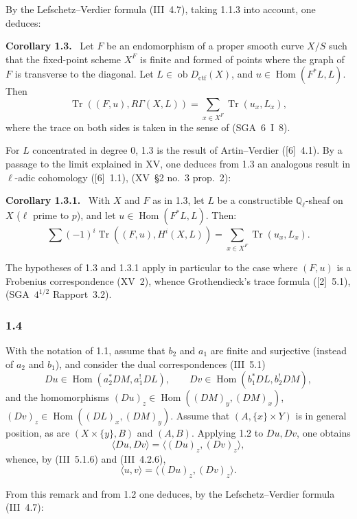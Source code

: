 \documentclass[11pt]{article}
\newenvironment{statement}[1]{\par\medskip\noindent\textbf{#1.}\ }{\par\medskip}
\DeclareMathOperator{\Hom}{Hom}
\newcommand{\ob}{\operatorname{ob}}
\providecommand{\ctf}{\mathrm{ctf}}
\providecommand{\Tr}{\operatorname{Tr}}
\providecommand{\Tr}{\operatorname{Tr}}
\providecommand{\Tr}{\operatorname{Tr}}
\providecommand{\Hom}{\operatorname{Hom}}
\providecommand{\ob}{\operatorname{ob}}
\providecommand{\Tr}{\operatorname{Tr}}
\providecommand{\Hom}{\operatorname{Hom}}
\providecommand{\Tr}{\operatorname{Tr}}
\begin{document}
By the Lefschetz--Verdier formula (III~4.7), taking 1.1.3 into account, one deduces:

\begin{statement}{Corollary 1.3}
Let $F$ be an endomorphism of a proper smooth curve $X/S$ such that the fixed-point scheme $X^F$ is finite and formed of points where the graph of $F$ is transverse to the diagonal. Let $L\in\ob D_{\ctf}(X)$, and $u\in\Hom(F^*L,L)$. Then
\[
\Tr((F,u),R\Gamma(X,L))=\sum_{x\in X^F}\Tr(u_x,L_x),
\]
where the trace on both sides is taken in the sense of (SGA~6~I~8).
\end{statement}

For $L$ concentrated in degree $0$, 1.3 is the result of Artin--Verdier ([6]~4.1). By a passage to the limit explained in XV, one deduces from 1.3 an analogous result in $\ell$-adic cohomology ([6]~1.1), (XV~\S2 no.~3 prop.~2):

\begin{statement}{Corollary 1.3.1}
With $X$ and $F$ as in 1.3, let $L$ be a constructible $\mathbb Q_\ell$-sheaf on $X$ ($\ell$ prime to $p$), and let $u\in\Hom(F^*L,L)$. Then:
\[
\sum(-1)^i\Tr((F,u),H^i(X,L))=\sum_{x\in X^F}\Tr(u_x,L_x).
\]
\end{statement}

The hypotheses of 1.3 and 1.3.1 apply in particular to the case where $(F,u)$ is a Frobenius correspondence (XV~2), whence Grothendieck's trace formula ([2]~5.1), (SGA~$4^{1/2}$ Rapport~3.2).

\subsubsection*{1.4}
With the notation of 1.1, assume that $b_2$ and $a_1$ are finite and surjective (instead of $a_2$ and $b_1$), and consider the dual correspondences (III~5.1)
\[
Du\in\Hom(a_2^*DM,a_1^!DL),\qquad Dv\in\Hom(b_1^*DL,b_2^!DM),
\]
and the homomorphisms $(Du)_z\in\Hom((DM)_y,(DM)_x)$, $(Dv)_z\in\Hom((DL)_x,(DM)_y)$. Assume that $(A,\{x\}\times Y)$ is in general position, as are $(X\times\{y\},B)$ and $(A,B)$. Applying 1.2 to $Du,Dv$, one obtains
\[
\langle Du,Dv\rangle=\langle (Du)_z,(Dv)_z\rangle,
\]
whence, by (III~5.1.6) and (III~4.2.6),
\begin{equation}\tag{1.4.1}
\langle u,v\rangle=\langle (Du)_z,(Dv)_z\rangle.
\end{equation}

From this remark and from 1.2 one deduces, by the Lefschetz--Verdier formula (III~4.7):
\end{document}
